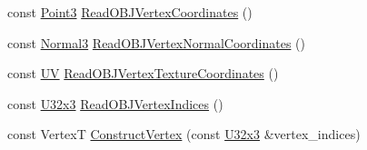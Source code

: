 \begin{DoxyCompactItemize}
\item 
const \mbox{\hyperlink{structmage_1_1_point3}{Point3}} \mbox{\hyperlink{classmage_1_1rendering_1_1loader_1_1_o_b_j_reader_a2c5d954441d64b982d7a89df9171edbc}{Read\+O\+B\+J\+Vertex\+Coordinates}} ()
\item 
const \mbox{\hyperlink{structmage_1_1_normal3}{Normal3}} \mbox{\hyperlink{classmage_1_1rendering_1_1loader_1_1_o_b_j_reader_aa91768722fd418aeba3f12915e8e1525}{Read\+O\+B\+J\+Vertex\+Normal\+Coordinates}} ()
\item 
const \mbox{\hyperlink{structmage_1_1_u_v}{UV}} \mbox{\hyperlink{classmage_1_1rendering_1_1loader_1_1_o_b_j_reader_a3fdbcdecf40525631afc53ce6a6dba45}{Read\+O\+B\+J\+Vertex\+Texture\+Coordinates}} ()
\item 
const \mbox{\hyperlink{namespacemage_a03e3b6f65630005f43a3112d1f6cf57b}{U32x3}} \mbox{\hyperlink{classmage_1_1rendering_1_1loader_1_1_o_b_j_reader_adf0996ca5d0339782382b46c14768b7f}{Read\+O\+B\+J\+Vertex\+Indices}} ()
\item 
const VertexT \mbox{\hyperlink{classmage_1_1rendering_1_1loader_1_1_o_b_j_reader_aa223ad518d2cdddd1c89a3f113356d77}{Construct\+Vertex}} (const \mbox{\hyperlink{namespacemage_a03e3b6f65630005f43a3112d1f6cf57b}{U32x3}} \&vertex\+\_\+indices)
\end{DoxyCompactItemize}
